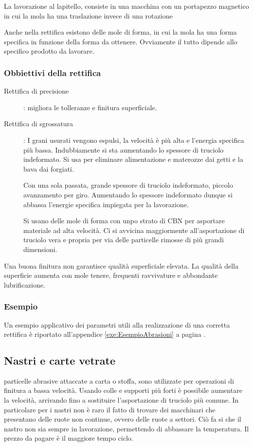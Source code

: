 La lavorazione al lapitello, consiste in una macchina con un portapezzo magnetico in cui la mola ha una traslazione invece di una rotazione

Anche nella rettifica esistono delle mole di forma, in cui la mola ha una forma specifica in funzione della forma da ottenere.
Ovviamente il tutto dipende allo specifico prodotto da lavorare.


\subsubsection{Obbiettivi della rettifica}
\begin{description}
\item[Rettifica di precisione]: migliora le tolleranze e finitura superficiale.
\item[Rettifica di sgrossatura]: I grani usurati vengono espulsi, la velocità è più alta e l'energia specifica più bassa. Indubbiamente si sta aumentando lo spessore di truciolo indeformato.
Si usa per eliminare alimentazione e materozze dai getti e la bava dai forgiati.
\item[] Con una sola passata, grande spessore di truciolo indeformato, piccolo avanzamento per giro.
Aumentando lo spessore indeformato dunque si abbassa l'energie specifica impiegata per la lavorazione.
\item[] Si usano delle mole di forma con unpo strato di CBN per asportare materiale ad alta velocità. Ci si avvicina maggiormente all'asportazione di truciolo vera e propria per via delle particelle rimosse di più grandi dimensioni.
\end{description}

Una buona finitura non garantisce qualità superficiale elevata.
La qualità della superficie aumenta con mole tenere, frequenti ravvivature e abbondante lubrificazione.

\subsubsection{Esempio}
Un esempio applicativo dei parametri utili alla realizzazione di una corretta rettifica è riportato all'appendice \ref{exe:EsempioAbrasioni} a pagina \pageref{exe:EsempioAbrasioni}.


\subsection{Nastri e carte vetrate}
particelle abrasive attaccate a carta o stoffa, sono utilizzate per operazioni di finitura a bassa velocità.
Usando colle e  supporti più forti è possibile aumentare la velocità, arrivando fino a sostituire l'asportazione di truciolo più comune.
In particolare per i nastri non è raro il fatto di trovare dei macchinari che presentano delle ruote non continue, ovvero delle ruote a settori.
Ciò fa si che il nastro non sia sempre in lavorazione, permettendo di abbassare la temperatura. Il prezzo da pagare è il maggiore tempo ciclo.

